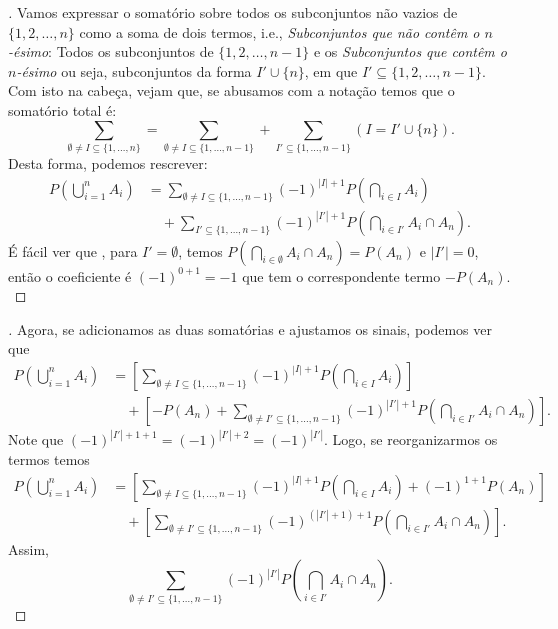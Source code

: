 \begin{frame}
	\begin{proof}[]	
Vamos expressar o somatório sobre todos os subconjuntos não vazios de \( \{1,2,\ldots,n\} \) como a soma de dois termos, i.e., 
{\it Subconjuntos que não contêm o \( n \)-ésimo}: Todos os subconjuntos de \( \{1,2,\ldots,n-1\} \) e os {\it Subconjuntos que contêm o \( n \)-ésimo} ou seja, subconjuntos da forma \( I' \cup \{ n \} \), em que \( I' \subseteq \{1,2,\ldots,n-1\} \).
\\
Com isto na cabeça,  vejam que, se abusamos com a  notação temos que
 o somatório total é:
 \[
\sum_{\emptyset \ne I \subseteq \{1,\ldots,n\}} = \sum_{\emptyset \ne I \subseteq \{1,\ldots,n-1\}} + \sum_{I' \subseteq \{1,\ldots,n-1\}} \left( I = I' \cup \{ n \} \right).
\]
Desta forma, podemos rescrever:
\[
\begin{aligned}
	P\left( \bigcup_{i=1}^{n} A_i \right) &= \sum_{\emptyset \ne I \subseteq \{1,\ldots,n-1\}} (-1)^{|I|+1} P\left( \bigcap_{i \in I} A_i \right) \\
	&\quad + \sum_{I' \subseteq \{1,\ldots,n-1\}} (-1)^{|I'| + 1} P\left( \bigcap_{i \in I'} A_i \cap A_n \right).
\end{aligned}
\]
É fácil ver que , para \( I' = \emptyset \), temos \( P\left( \bigcap_{i \in \emptyset} A_i \cap A_n \right) = P(A_n) \) e \( |I'| = 0 \), então o coeficiente é $(-1)^{0+1} = -1$ que tem o correspondente termo $ - P(A_n).$
\end{proof}
\end{frame}



\begin{frame}
\begin{proof}[]	
Agora, se adicionamos as duas somatórias e ajustamos os sinais, podemos ver que
\[
\begin{aligned}
	P\left( \bigcup_{i=1}^{n} A_i \right) &= \left[ \sum_{\emptyset \ne I \subseteq \{1,\ldots,n-1\}} (-1)^{|I|+1} P\left( \bigcap_{i \in I} A_i \right) \right] \\
	&\quad + \left[ - P(A_n) + \sum_{\emptyset \ne I' \subseteq \{1,\ldots,n-1\}} (-1)^{|I'|+1} P\left( \bigcap_{i \in I'} A_i \cap A_n \right) \right].
\end{aligned}
\]	Note que \( (-1)^{|I'|+1+1} = (-1)^{|I'|+2} = (-1)^{|I'|} \). Logo, se reorganizarmos os termos temos
\[
\begin{aligned}
	P\left( \bigcup_{i=1}^{n} A_i \right) &= \left[ \sum_{\emptyset \ne I \subseteq \{1,\ldots,n-1\}} (-1)^{|I|+1} P\left( \bigcap_{i \in I} A_i \right) + (-1)^{1+1} P(A_n) \right] \\
	&\quad + \left[ \sum_{\emptyset \ne I' \subseteq \{1,\ldots,n-1\}} (-1)^{(|I'| + 1)+1} P\left( \bigcap_{i \in I'} A_i \cap A_n \right) \right].
\end{aligned}
\]
Assim, 
\[
\sum_{\emptyset \ne I' \subseteq \{1,\ldots,n-1\}} (-1)^{|I'|} P\left( \bigcap_{i \in I'} A_i \cap A_n \right).
\]

\end{proof}
\end{frame}

